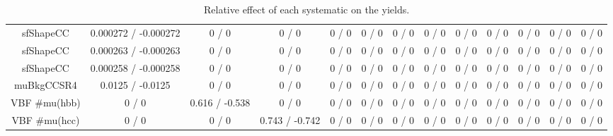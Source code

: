 \documentclass[10pt]{article}
\begin{document}
\begin{table}[htbp]
\begin{center}
\begin{tabular}{|c|c|c|c|c|c|c|c|c|c|c|c|c|}
  sfShapeCC & 0.000272 / -0.000272 & 0 / 0 & 0 / 0 & 0 / 0 & 0 / 0 & 0 / 0 & 0 / 0 & 0 / 0 & 0 / 0 & 0 / 0 & 0 / 0 & 0 / 0 \\ 
  sfShapeCC & 0.000263 / -0.000263 & 0 / 0 & 0 / 0 & 0 / 0 & 0 / 0 & 0 / 0 & 0 / 0 & 0 / 0 & 0 / 0 & 0 / 0 & 0 / 0 & 0 / 0 \\ 
  sfShapeCC & 0.000258 / -0.000258 & 0 / 0 & 0 / 0 & 0 / 0 & 0 / 0 & 0 / 0 & 0 / 0 & 0 / 0 & 0 / 0 & 0 / 0 & 0 / 0 & 0 / 0 \\ 
  muBkgCCSR4 & 0.0125 / -0.0125 & 0 / 0 & 0 / 0 & 0 / 0 & 0 / 0 & 0 / 0 & 0 / 0 & 0 / 0 & 0 / 0 & 0 / 0 & 0 / 0 & 0 / 0 \\ 
  VBF #mu(hbb) & 0 / 0 & 0.616 / -0.538 & 0 / 0 & 0 / 0 & 0 / 0 & 0 / 0 & 0 / 0 & 0 / 0 & 0 / 0 & 0 / 0 & 0 / 0 & 0 / 0 \\ 
  VBF #mu(hcc) & 0 / 0 & 0 / 0 & 0.743 / -0.742 & 0 / 0 & 0 / 0 & 0 / 0 & 0 / 0 & 0 / 0 & 0 / 0 & 0 / 0 & 0 / 0 & 0 / 0 \\ 
\hline 
\end{tabular} 
\caption{Relative effect of each systematic on the yields.} 
\end{center} 
\end{table} 
\end{document}
